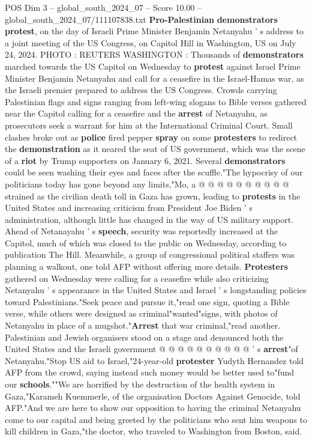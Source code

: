 \begin{textsample}{POS Dim 3 – global\_south\_2024\_07 – Score 10.00 – global\_south\_2024\_07/111107838.txt}  \label{ex:f3_pos_313}
\textbf{Pro-Palestinian} \textbf{demonstrators} \textbf{protest}, on the day of Israeli Prime Minister Benjamin Netanyahu ' s address to a joint meeting of the US Congress, on Capitol Hill in Washington, US on July 24, 2024.
PHOTO : REUTERS WASHINGTON : Thousands of \textbf{demonstrators} marched towards the US Capitol on Wednesday to \textbf{protest} against Israel Prime Minister Benjamin Netanyahu and call for a ceasefire in the Israel-Hamas war, as the Israeli premier prepared to address the US Congress.
Crowds carrying Palestinian flags and signs ranging from left-wing slogans to Bible verses gathered near the Capitol calling for a ceasefire and the \textbf{arrest} of Netanyahu, as prosecutors seek a warrant for him at the International Criminal Court.
Small clashes broke out as \textbf{police} fired pepper \textbf{spray} on some \textbf{protesters} to redirect the \textbf{demonstration} as it neared the seat of US government, which was the scene of a \textbf{riot} by Trump supporters on January 6, 2021.
Several \textbf{demonstrators} could be seen washing their eyes and faces after the scuffle."The hypocrisy of our politicians today has gone beyond any limits,"Mo, a @ @ @ @ @ @ @ @ @ @ strained as the civilian death toll in Gaza has grown, leading to \textbf{protests} in the United States and increasing criticism from President Joe Biden ' s administration, although little has changed in the way of US military support.
Ahead of Netanayahu ' s \textbf{speech}, security was reportedly increased at the Capitol, much of which was closed to the public on Wednesday, according to publication The Hill.
Meanwhile, a group of congressional political staffers was planning a walkout, one told AFP without offering more details. \textbf{Protesters} gathered on Wednesday were calling for a ceasefire while also criticizing Netanyahu ' s appearance in the United States and Israel ' s longstanding policies toward Palestinians."Seek peace and pursue it,"read one sign, quoting a Bible verse, while others were designed as criminal"wanted"signs, with photos of Netanyahu in place of a mugshot."\textbf{Arrest} that war criminal,"read another.
Palestinian and Jewish organisers stood on a stage and denounced both the United States and the Israeli government @ @ @ @ @ @ @ @ @ @ ' s \textbf{arrest}"of Netanyahu."Stop US aid to Israel,"24-year-old \textbf{protester} Yudyth Hernandez told AFP from the crowd, saying instead such money would be better used to"fund our \textbf{schools}.""We are horrified by the destruction of the health system in Gaza,"Karameh Kuemmerle, of the organisation Doctors Against Genocide, told AFP."And we are here to show our opposition to having the criminal Netanyahu come to our capital and being greeted by the politicians who sent him weapons to kill children in Gaza,"the doctor, who traveled to Washington from Boston, said.

\end{textsample}
